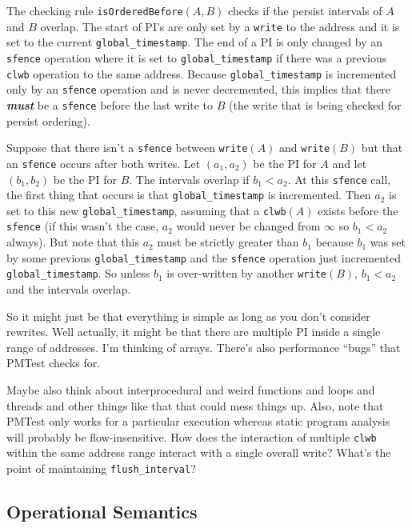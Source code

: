 \documentclass[11pt]{article}
\begin{document}
The checking rule \texttt{isOrderedBefore}\((A,B)\) checks if the persist intervals of \(A\) and \(B\) overlap. The start of PI's are only set by a \texttt{write} to the address and it is set to the current \texttt{global_timestamp}. The end of a PI is only changed by an \texttt{sfence} operation where it is set to \texttt{global_timestamp} if there was a previous \texttt{clwb} operation to the same address. Because \texttt{global_timestamp} is incremented only by an \texttt{sfence} operation and is never decremented, this implies that there \textit{\textbf{must}} be a \texttt{sfence} before the last write to \(B\) (the write that is being checked for persist ordering).

Suppose that there isn't a \texttt{sfence} between \texttt{write}\((A)\) and \texttt{write}\((B)\) but that an \texttt{sfence} occurs after both writes. Let \(\left( a_1, a_2 \right)\) be the PI for \(A\) and let \((b_1, b_2)\) be the PI for \(B\). The intervals overlap if \(b_1 < a_2\). At this \texttt{sfence} call, the first thing that occurs is that \texttt{global_timestamp} is incremented. Then \(a_2\) is set to this new \texttt{global_timestamp}, assuming that a \texttt{clwb}\((A)\) exists before the \texttt{sfence} (if this wasn't the case, \(a_2\) would never be changed from \(\infty\) so \(b_1 < a_2\) always). But note that this \(a_2\) must be strictly greater than \(b_1\) because \(b_1\) was set by some previous \texttt{global_timestamp} and the \texttt{sfence} operation just incremented \texttt{global_timestamp}. So unless \(b_1\) is over-written by another \texttt{write}\((B)\), \(b_1 < a_2\) and the intervals overlap.


\begin{note}
So it might just be that everything is simple as long as you don't consider rewrites. Well actually, it might be that there are multiple PI inside a single range of addresses. I'm thinking of arrays. There's also performance ``bugs'' that PMTest checks for.
\end{note}

Maybe also think about interprocedural and weird functions and loops and threads and other things like that that could mess things up. Also, note that PMTest only works for a particular execution whereas static program analysis will probably be flow-insensitive. How does the interaction of multiple \texttt{clwb} within the same address range interact with a single overall write? What's the point of maintaining \texttt{flush_interval}?


\subsection{Operational Semantics}
\end{document}
